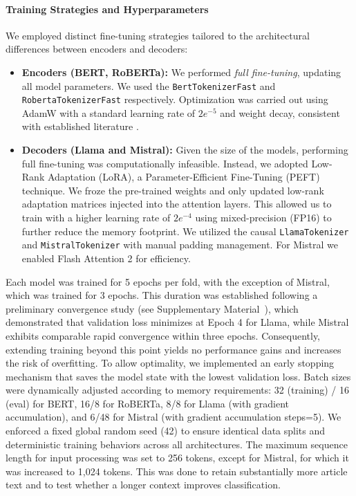 \documentclass[journal]{IEEEtran}
\begin{document}
\paragraph{Training Strategies and Hyperparameters}
We employed distinct fine-tuning strategies tailored to the architectural differences between encoders and decoders:
\begin{itemize}
    \item \textbf{Encoders (BERT, RoBERTa):} We performed \textit{full fine-tuning}, updating all model parameters. We used the \texttt{BertTokenizerFast} and \texttt{RobertaTokenizerFast} respectively. Optimization was carried out using AdamW with a standard learning rate of $2e^{-5}$ and weight decay, consistent with established literature \cite{devlin2019bert, liu2019roberta}.

    \item \textbf{Decoders (Llama and Mistral):} Given the size of the models, performing full fine-tuning was computationally infeasible. Instead, we adopted Low-Rank Adaptation (LoRA), a Parameter-Efficient Fine-Tuning (PEFT) technique. We froze the pre-trained weights and only updated low-rank adaptation matrices injected into the attention layers. This allowed us to train with a higher learning rate of $2e^{-4}$ using mixed-precision (FP16) to further reduce the memory footprint. We utilized the causal \texttt{LlamaTokenizer} and \texttt{MistralTokenizer} with manual padding management. For Mistral we enabled Flash Attention 2 for efficiency.

\end{itemize}

Each model was trained for 5 epochs per fold, with the exception of Mistral, which was trained for 3 epochs. This duration was established following a preliminary convergence study (see Supplementary Material~\cite{bianchi2026supplementary}), which demonstrated that validation loss minimizes at Epoch 4 for Llama, while Mistral exhibits comparable rapid convergence within three epochs. Consequently, extending training beyond this point yields no performance gains and increases the risk of overfitting. To allow optimality, we implemented an early stopping mechanism that saves the model state with the lowest validation loss. Batch sizes were dynamically adjusted according to memory requirements: 32 (training) / 16 (eval) for BERT, 16/8 for RoBERTa, 8/8 for Llama (with gradient accumulation), and 6/48 for Mistral (with gradient accumulation steps=5). We enforced a fixed global random seed (42) to ensure identical data splits and deterministic training behaviors across all architectures. The maximum sequence length for input processing was set to 256 tokens, except for Mistral, for which it was increased to 1,024 tokens. This was done to retain substantially more article text and to test whether a longer context improves classification.
\end{document}

